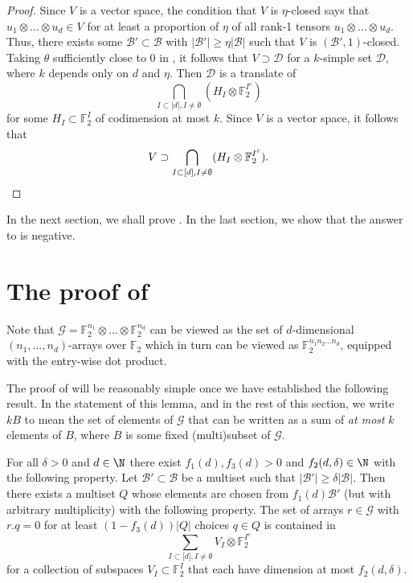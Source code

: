\documentclass{toc}
\newcommand\F{\mathbb{F}}
\renewcommand\d{\delta}
\newcommand \cB{\mathcal B}
\newcommand \cD{\mathcal D}
\newcommand \cG{\mathcal G}
\newcommand \s{\subset}
\begin{document}
\begin{proof}
  Since $V$ is a vector space, the condition that $V$ is $\eta$-closed says that $u_1\otimes \dots \otimes u_d\in V$ for at least a proportion of $\eta$ of all rank-1 tensors $u_1\otimes \dots \otimes u_d$. Thus, there exists some $\cB'\s \cB$ with $|\cB'|\geq \eta |\cB|$ such that $V$ is $(\cB',1)$-closed. Taking $\theta$ sufficiently close to $0$ in , it follows that $V\supset \cD$ for a $k$-simple set $\cD$, where $k$ depends only on $d$ and $\eta$. Then $\cD$ is a translate of
  \[
    \bigcap_{I\s \lbrack d\rbrack,I\neq \emptyset}(H_I\otimes \F_2^{I^c})
  \]
  for some $H_I\s \F_2^{I}$ of codimension at most $k$. Since $V$ is a
  vector space, it follows that
  \[
    V\supset \bigcap_{I\s \lbrack d\rbrack,I\neq \emptyset}(H_I\otimes
    \F_2^{I^c}). \qedhere
  \]
\end{proof}

\noindent In the next section, we shall prove . In the last section, we show that the answer to  is negative.

\section{The proof of }

Note that $\cG=\F_2^{n_1}\otimes\dots\otimes\F_2^{n_d}$ can be viewed as the set of $d$-dimensional $(n_1,\dots,n_d)$-arrays over $\F_2$ which in turn can be viewed as $\F_2^{n_1n_2\dots n_d}$, equipped with the entry-wise dot product.

The proof of  will be reasonably simple once we have established the following result. In the statement of this lemma, and in the rest of this section, we write $kB$ to mean the set of elements of $\cG$ that can be written as a sum of \textit{at most} $k$ elements of $B$, where $B$ is some fixed (multi)subset of $\cG$.

\begin{lemma} \label{mainlemma}
  For all $\d>0$ and $d\in\N$ there exist $f_1(d),f_3(d)>0$ and $f_2(d,\d)\in\N$ with the following property. Let $\cB'\subset \cB$ be a multiset such that $|\cB'|\geq \d |\cB|$. Then there exists a multiset $Q$ whose elements are chosen from $f_1(d)\cB'$ (but with arbitrary multiplicity) with the following property. The set of arrays $r\in \cG$ with $r.q=0$ for at least $(1-f_3(d))|Q|$ choices $q\in Q$ is contained in
  \[
    \sum_{I\subset \lbrack d\rbrack, I\neq \emptyset} V_I\otimes \F_2^{I^c}
  \]
  for a collection of subspaces $V_I\subset \F_2^{I}$ that each have
  dimension at most $f_2(d,\d)$.
\end{lemma}
\end{document}
